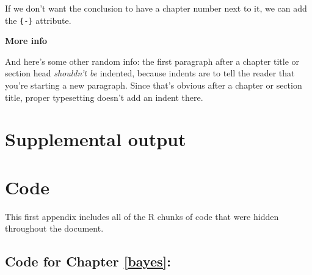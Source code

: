 \documentclass[12pt, twoside]{amherstthesis}
\begin{document}
If we don't want the conclusion to have a chapter number next to it, we can add the \texttt{\{-\}} attribute.

\textbf{More info}

And here's some other random info: the first paragraph after a chapter title or section head \emph{shouldn't be} indented, because indents are to tell the reader that you're starting a new paragraph. Since that's obvious after a chapter or section title, proper typesetting doesn't add an indent there.

\appendix

\hypertarget{supplemental-output}{%
\chapter{Supplemental output}\label{supplemental-output}}

\hypertarget{code}{%
\chapter{Code}\label{code}}

This first appendix includes all of the R chunks of code that were hidden throughout the document.

\hypertarget{code-for-chapter-refbayes}{%
\section{Code for Chapter \ref{bayes}:}\label{code-for-chapter-refbayes}}
\end{document}

